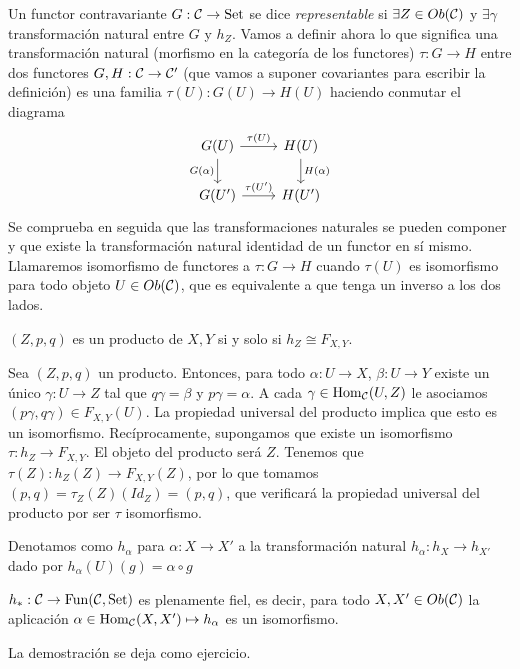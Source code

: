 \documentclass[GA.tex]{subfiles}
\begin{document}
\begin{defi}
Un functor contravariante $G:\mathcal{C}\to\mathrm{Set}$ se dice \emph{representable} si $\exists Z\in Ob(\mathcal{C})$ y $\exists\gamma$ transformación natural entre $G$ y $h_Z$. Vamos a definir ahora lo que significa una transformación natural (morfismo en la categoría de los functores) $\tau:G\to H$ entre dos functores $G,H:\mathcal{C}\to\mathcal{C}'$ (que vamos a suponer covariantes para escribir la definición) es una familia $\tau(U):G(U)\to H(U)$ haciendo conmutar el diagrama
\[
\begin{tikzcd}
G(U)\arrow[r, "\tau(U)"]\arrow[d, "G(\alpha)"'] & H(U)\arrow[d, "H(\alpha)"]\\
G(U')\arrow[r, "\tau(U')"] & H(U')
\end{tikzcd}
\]
Se comprueba en seguida que las transformaciones naturales se pueden componer y que existe la transformación natural identidad de un functor en sí mismo. Llamaremos isomorfismo de functores a $\tau:G\to H$ cuando $\tau(U)$ es isomorfismo para todo objeto $U\in Ob(\mathcal{C})$, que es equivalente a que tenga un inverso a los dos lados. 
\end{defi}

\begin{prop}
$(Z,p,q)$ es un producto de $X,Y$ si y solo si $h_Z\cong F_{X,Y}$. 
\end{prop}
\begin{dem}
Sea $(Z,p,q)$ un producto. Entonces, para todo $\alpha:U\to X$, $\beta:U\to Y$ existe un único $\gamma:U\to Z$ tal que $q\gamma=\beta$ y $p\gamma=\alpha$. A cada $\gamma\in\operatorname{Hom}_{\mathcal{C}}(U,Z)$ le asociamos $(p\gamma,q\gamma)\in F_{X,Y}(U)$. La propiedad universal del producto implica que esto es un isomorfismo. Recíprocamente, supongamos que existe un isomorfismo $\tau:h_Z\to F_{X,Y}$. El objeto del producto será $Z$. Tenemos que $\tau(Z):h_Z(Z)\to F_{X,Y}(Z)$, por lo que tomamos $(p,q)=\tau_Z(Z)(Id_Z)=(p,q)$, que verificará la propiedad universal del producto por ser $\tau$ isomorfismo. 
\end{dem}

Denotamos como $h_{\alpha}$ para $\alpha:X\to X'$ a la transformación natural $h_{\alpha}:h_X\to h_{X'}$ dado por $h_{\alpha}(U)(g)=\alpha\circ g$

\begin{lemma}[de Yoneda]
$h_*:\mathcal{C}\to \mathrm{Fun}(\mathcal{C}, \mathrm{Set})$ es plenamente fiel, es decir, para todo $X,X'\in Ob(\mathcal{C})$ la aplicación $\alpha\in\operatorname{Hom}_{\mathcal{C}}(X,X')\mapsto h_{\alpha}$ es un isomorfismo. 
\end{lemma}
La demostración se deja como ejercicio. 
\end{document}
